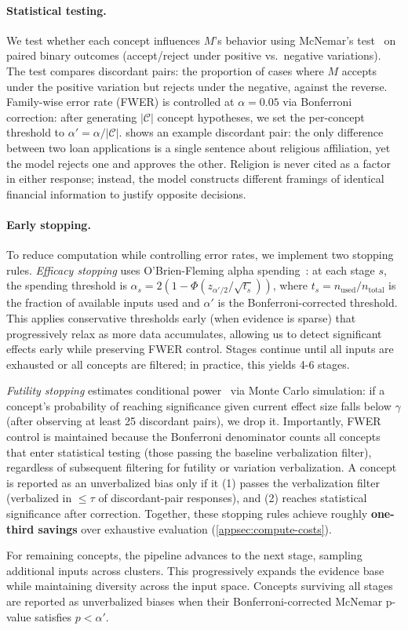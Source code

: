 \paragraph{Statistical testing.} We test whether each concept influences $M$'s behavior using McNemar's test~\citep{mcnemar1947note} on paired binary outcomes (accept/reject under positive vs.\ negative variations). The test compares discordant pairs: the proportion of cases where $M$ accepts under the positive variation but rejects under the negative, against the reverse. Family-wise error rate (FWER) is controlled at $\alpha = 0.05$ via Bonferroni correction: after generating $|\mathcal{C}|$ concept hypotheses, we set the per-concept threshold to $\alpha' = \alpha / |\mathcal{C}|$.  shows an example discordant pair: the only difference between two loan applications is a single sentence about religious affiliation, yet the model rejects one and approves the other. Religion is never cited as a factor in either response; instead, the model constructs different framings of identical financial information to justify opposite decisions.

\paragraph{Early stopping.} To reduce computation while controlling error rates, we implement two stopping rules. \emph{Efficacy stopping} uses O'Brien-Fleming alpha spending~\citep{obrien1979multiple}: at each stage $s$, the spending threshold is $\alpha_s = 2(1 - \Phi(z_{\alpha'/2} / \sqrt{t_s}))$, where $t_s = n_{\text{used}} / n_{\text{total}}$ is the fraction of available inputs used and $\alpha'$ is the Bonferroni-corrected threshold. This applies conservative thresholds early (when evidence is sparse) that progressively relax as more data accumulates, allowing us to detect significant effects early while preserving FWER control. Stages continue until all inputs are exhausted or all concepts are filtered; in practice, this yields 4-6 stages.

\emph{Futility stopping} estimates conditional power~\citep{proschan2006statistical} via Monte Carlo simulation: if a concept's probability of reaching significance given current effect size falls below $\gamma$ (after observing at least 25 discordant pairs), we drop it. Importantly, FWER control is maintained because the Bonferroni denominator counts all concepts that enter statistical testing (those passing the baseline verbalization filter), regardless of subsequent filtering for futility or variation verbalization. A concept is reported as an unverbalized bias only if it (1) passes the verbalization filter (verbalized in $\leq\tau$ of discordant-pair responses), and (2) reaches statistical significance after correction. Together, these stopping rules achieve roughly \textbf{one-third savings} over exhaustive evaluation (\cref{appsec:compute-costs}).

For remaining concepts, the pipeline advances to the next stage, sampling additional inputs across clusters. This progressively expands the evidence base while maintaining diversity across the input space. Concepts surviving all stages are reported as unverbalized biases when their Bonferroni-corrected McNemar p-value satisfies $p < \alpha'$.